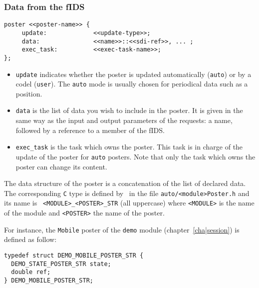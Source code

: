 \subsubsection{Data from the fIDS}

\begin{center}\begin{cartouche}\small\begin{verbatim}
poster <<poster-name>> {
     update:             <<update-type>>;
     data:               <<name>>::<<sdi-ref>>, ... ;
     exec_task:          <<exec-task-name>>; 
};
\end{verbatim}\end{cartouche}\end{center}

\begin{itemize}
\item {\tt update} indicates whether the poster is updated automatically
({\tt auto}) or by  a codel ({\tt user}). The  {\tt auto} mode is usually
chosen for periodical data such as a position.

\item {\tt data} is the list of data you wish to include in the
poster. It is given in the same way as the input and output parameters of
the requests: a name, followed by a reference to a member of the fIDS.

\item {\tt exec\_task} is the task which owns the poster. This task is in
charge of the update of the poster for {\tt auto} posters. Note that only
the task which owns the poster can change its content.
\end{itemize}

The data  structure  of the  poster is  a concatenation  of  the  list of
declared data.  The corresponding  {\tt C} type  is defined by \GenoM\ in
the     file   {\tt  auto/<module>Poster.h} and     its    name  is  {\tt
<MODULE>\_<POSTER>\_STR} (all uppercase) where {\tt <MODULE>} is the name
of the module and {\tt <POSTER>} the name of the poster.

For  instance,   the {\tt  Mobile}  poster  of    the {\tt  demo}  module
(chapter~\ref{cha|session}) is defined as follow:

\begin{center}\begin{cartouche}\small\begin{verbatim}
typedef struct DEMO_MOBILE_POSTER_STR {
  DEMO_STATE_POSTER_STR state;
  double ref;
} DEMO_MOBILE_POSTER_STR;
\end{verbatim}\end{cartouche}\end{center}


